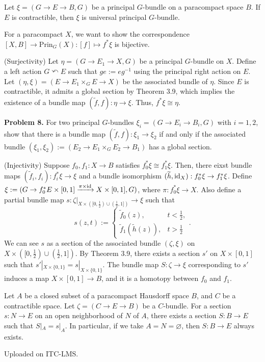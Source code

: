 \documentclass{../../../small}
\begin{document}
\begin{thm*}[3.8]
Let $\xi=(G\to E\to B,G)$ be a principal $G$-bundle on a paracompact space $B$.
If $E$ is contractible, then $\xi$ is universal principal $G$-bundle.
\end{thm*}
\begin{pf}
For a paracompact $X$, we want to show the correspondence $[X,B]\to\mathrm{Prin}_G(X):[f]\mapsto f^*\xi$ is bijective.

(Surjectivity)
Let $\eta=(G\to E_1\to X,G)$ be a principal $G$-bundle on $X$.
Define a left action $G\curvearrowleft E$ such that $ge:=eg^{-1}$ using the principal right action on $E$.
Let $(\eta,\xi)=(E\to E_1\times_G E\to X)$ be the associated bundle of $\eta$.
Since $E$ is contractible, it admits a global section by Theorem 3.9, which implies the existence of a bundle map $(\tilde f,f):\eta\to\xi$.
Thus, $f^*\xi\cong\eta$.

\noindent\textbf{Problem 8.} For two principal $G$-bundles $\xi_i=(G\to E_i\to B_i,G)$ with $i=1,2$, show that there is a bundle map $(\tilde f,f):\xi_1\to\xi_2$ if and only if the associated bundle $(\xi_1,\xi_2):=(E_2\to E_1\times_G E_2\to B_1)$ has a global section.

(Injectivity)
Suppose $f_0,f_1:X\to B$ satisfies $f_0^*\xi\cong f_1^*\xi$.
Then, there eixst bundle maps $(\tilde f_i,f_i):f_i^*\xi\to\xi$ and a bundle isomorphism $(\widetilde h,\operatorname{id}_X):f_0^*\xi\to f_1^*\xi$.
Define $\xi:=(G\to f_0^*E\times[0,1]\xrightarrow{\pi\times\operatorname{id}}X\times[0,1],G)$, where $\pi:f_0^*\xi\to X$.
Also define a partial bundle map $s:\zeta|_{X\times([0,\frac12)\cup(\frac12,1])}\to\xi$ such that
\[s(z,t):=\begin{cases}
\tilde f_0(z),&t<\frac12,\\
\tilde f_1(\tilde h(z)),& t>\frac12
\end{cases}.\]
We can see $s$ as a section of the associated bundle $(\zeta,\xi)$ on $X\times([0,\frac12)\cup(\frac12,1])$.
By Theorem 3.9, there exists a section $s'$ on $X\times[0,1]$ such that $s'|_{X\times\{0,1\}}=s|_{X\times\{0,1\}}$.
The bundle map $S:\zeta\to\xi$ corresponding to $s'$ induces a map $X\times [0,1]\to B$, and it is a homotopy between $f_0$ and $f_1$.
\end{pf}

\begin{thm*}[3.9]
Let $A$ be a closed subset of a paracompact Hausdorff space $B$, and $C$ be a contractible space.
Let $\zeta=(C\to E\to B)$ be a $C$-bundle.
For a section $s:N\to E$ on an open neighborhood of $N$ of $A$, there exists a section $S:B\to E$ such that $S|_A=s|_A$.
In particular, if we take $A=N=\varnothing$, then $S:B\to E$ always exists.
\end{thm*}
\begin{pf}
Uploaded on ITC-LMS.
\end{pf}
\end{document}
